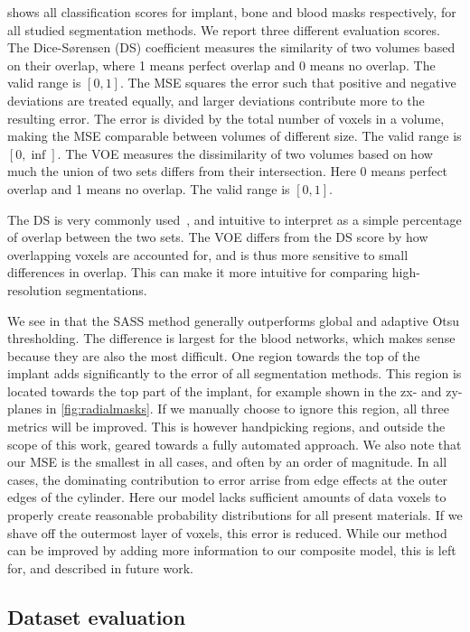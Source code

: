  shows all classification scores for implant, bone and blood
masks respectively, for all studied segmentation methods. We report three
different evaluation scores. The Dice-Sørensen (DS) coefficient measures the
similarity of two volumes based on their overlap, where 1 means perfect overlap
and 0 means no overlap. The valid range is $[0,1]$. The MSE squares the error
such that positive and negative deviations are treated equally, and larger
deviations contribute more to the resulting error. The error is divided by the
total number of voxels in a volume, making the MSE comparable between volumes
of different size.  The valid range is $[0,\inf]$. The VOE measures the
dissimilarity of two volumes based on how much the union of two sets differs
from their intersection. Here 0 means perfect overlap and 1 means no overlap.
The valid range is $[0,1]$.

The DS is very commonly used~\cite{evaluation_review}, and intuitive to
interpret as a simple percentage of overlap between the two sets. The VOE
differs from the DS score by how overlapping voxels are accounted for, and is
thus more sensitive to small differences in overlap. This can make it more
intuitive for comparing high-resolution segmentations.

We see in  that the SASS method generally outperforms global
and adaptive Otsu thresholding. The difference is largest for the blood
networks, which makes sense because they are also the most difficult. One
region towards the top of the implant adds significantly to the error of all
segmentation methods. This region is located towards the top part of the
implant, for example shown in the zx- and zy-planes in \cref{fig:radialmasks}.
If we manually choose to ignore this region, all three metrics will be
improved. This is however handpicking regions, and outside the scope of this
work, geared towards a fully automated approach. We also note that our MSE is
the smallest in all cases, and often by an order of magnitude. In all cases,
the dominating contribution to error arrise from edge effects at the outer
edges of the cylinder. Here our model lacks sufficient amounts of data voxels
to properly create reasonable probability distributions for all present
materials. If we shave off the outermost layer of voxels, this error is
reduced. While our method can be improved by adding more information to our
composite model, this is left for, and described in future work.

\subsection{Dataset evaluation}

